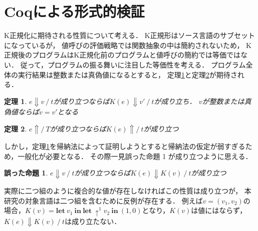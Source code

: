 \documentclass[T]{compsoft}
\newcommand{\keyword}[1]{\mathbf{#1}}
\newcommand{\LET}{\keyword{let}}
\newcommand{\IN}{\keyword{in}}
\newcommand{\theoremname}{定理}
\newtheorem{theorem}{\theoremname}
\newcommand{\wrongpropositioname}{誤った命題}
\newtheorem{wrongproposition}{\wrongpropositioname}
\begin{document}
\section{Coqによる形式的検証}\label{section:verification}
K正規化に期待される性質について考える．
K正規形はソース言語のサブセットになっているが，
値呼びの評価戦略では関数抽象の中は簡約されないため，
K正規後のプログラムはK正規化前のプログラムと値呼びの簡約では等価ではない．
従って，プログラムの振る舞いに注目した等価性を考える．
プログラム全体の実行結果は整数または真偽値になるとすると，
\theoremname\ref{theorem:eval-correctness}と\theoremname\ref{theorem:diverge-correctness}が期待される．
\begin{theorem}\label{theorem:eval-correctness}
	$e\Downarrow v~/~t$が成り立つならば$K(e)\Downarrow v'~/~t$が成り立ち．
	$v$が整数または真偽値ならば$v=v'$となる
\end{theorem}
\begin{theorem}\label{theorem:diverge-correctness}
	$e\Uparrow/~T$が成り立つならば$K(e)\Uparrow/~t$が成り立つ
\end{theorem}

しかし，\theoremname\ref{theorem:eval-correctness}を帰納法によって証明しようとすると帰納法の仮定が弱すぎるため，一般化が必要となる．
その際一見\wrongpropositioname
1 %
が成り立つように思える．
\begin{wrongproposition}\label{wrongproposition:wrong-lemma}
	$e\Downarrow v~/~t$が成り立つならば$K(e)\Downarrow K(v)~/~t$が成り立つ
\end{wrongproposition}
実際に二つ組のように複合的な値が存在しなければこの性質は成り立つが，
本研究の対象言語は二つ組を含むために反例が存在する．
例えば$v=(v_1,v_2)$の場合，$K(v)=\LET~v_1~\IN~\LET~\uparrow^1 v_2~\IN~(1,0)$となり，$K(v)$は値にはならず，
$K(e)\Downarrow K(v)~/~t$は成り立たない．
\end{document}
